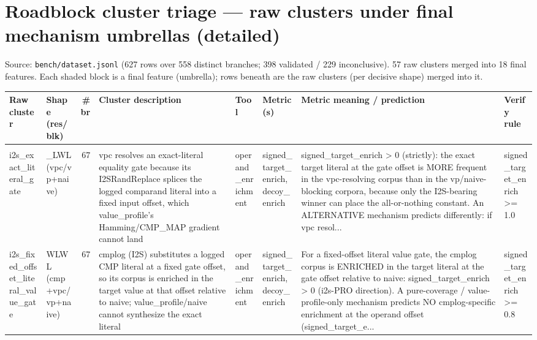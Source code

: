 \documentclass[7pt]{extarticle}
\begin{document}
\section*{Roadblock cluster triage --- raw clusters under final mechanism umbrellas (detailed)}
\noindent\small Source: \texttt{bench/dataset.jsonl} (627 rows over 558 distinct branches; 398 validated / 229 inconclusive). 57 raw clusters merged into 18 final features. Each shaded block is a final feature (umbrella); rows beneath are the raw clusters (per decisive shape) merged into it.\\[3pt]
{\scriptsize\begin{longtable}{@{}p{2.4cm}p{1.9cm}rp{4.3cm}p{1.5cm}p{1.7cm}p{4.6cm}p{3.0cm}@{}}
\toprule \textbf{Raw cluster}&\textbf{Shape (res/blk)}&\textbf{\#br}&\textbf{Cluster description}&\textbf{Tool}&\textbf{Metric(s)}&\textbf{Metric meaning / prediction}&\textbf{Verify rule}\\\midrule
\endhead
\rowcolor{black!10}\multicolumn{8}{@{}l}{\textbf{[I2S-pro]\ \ i2s\_\allowbreak string\_\allowbreak literal\_\allowbreak substitution}\quad(final feature, n=191)}\\
i2s\_\allowbreak exact\_\allowbreak literal\_\allowbreak gate & \_\allowbreak LWL (vpc/vp+naive) & 67 & vpc resolves an exact-literal equality gate because its I2SRandReplace splices the logged comparand literal into a fixed input offset, which value\_\allowbreak profile's Hamming/CMP\_\allowbreak MAP gradient cannot land & operand\_\allowbreak enrichment & signed\_\allowbreak target\_\allowbreak enrich, decoy\_\allowbreak enrich & signed\_\allowbreak target\_\allowbreak enrich \textgreater{} 0 (strictly): the exact target literal at the gate offset is MORE frequent in the vpc-resolving corpus than in the vp/naive-blocking corpora, because only the I2S-bearing winner can place the all-or-nothing constant. An ALTERNATIVE mechanism predicts differently: if vpc resol... & signed\_\allowbreak target\_\allowbreak enrich \textgreater{}= 1.0\\
i2s\_\allowbreak fixed\_\allowbreak offset\_\allowbreak literal\_\allowbreak value\_\allowbreak gate & WLWL (cmp+vpc/vp+naive) & 67 & cmplog (I2S) substitutes a logged CMP literal at a fixed gate offset, so its corpus is enriched in the target value at that offset relative to naive; value\_\allowbreak profile/naive cannot synthesize the exact literal & operand\_\allowbreak enrichment & signed\_\allowbreak target\_\allowbreak enrich, decoy\_\allowbreak enrich & For a fixed-offset literal value gate, the cmplog corpus is ENRICHED in the target literal at the gate offset relative to naive: signed\_\allowbreak target\_\allowbreak enrich \textgreater{} 0 (i2s-PRO direction). A pure-coverage / value-profile-only mechanism predicts NO cmplog-specific enrichment at the operand offset (signed\_\allowbreak target\_\allowbreak e... & signed\_\allowbreak target\_\allowbreak enrich \textgreater{}= 0.8\\

\end{longtable}}
\end{document}
